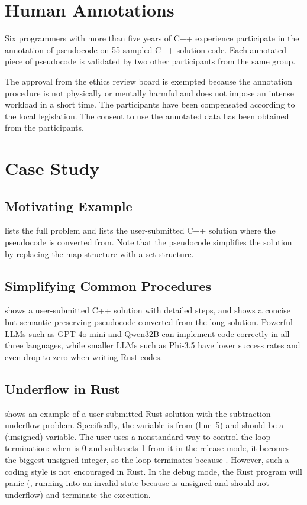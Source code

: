 \section{Human Annotations}
Six programmers with more than five years of C++ experience participate in the annotation of pseudocode on 55 sampled C++ solution code.
Each annotated piece of pseudocode is validated by two other participants from the same group.

The approval from the ethics review board is exempted because the annotation procedure is not physically or mentally harmful and does not impose an intense workload in a short time.
The participants have been compensated according to the local legislation.
The consent to use the annotated data has been obtained from the participants.

\section{Case Study}

\subsection{Motivating Example}\label{subsec:motv-ex}
 lists the full problem and  lists the user-submitted C++ solution where the pseudocode is converted from.
Note that the pseudocode simplifies the solution by replacing the map structure with a set structure.

\subsection{Simplifying Common Procedures}\label{subsec:simplication}
 shows a user-submitted C++ solution with detailed steps, and  shows a concise but semantic-preserving pseudocode converted from the long solution.
Powerful LLMs such as GPT-4o-mini and Qwen32B can implement code correctly in all three languages, while smaller LLMs such as Phi-3.5 have lower success rates and even drop to zero when writing Rust codes. 

\subsection{Underflow in Rust}\label{subsec:rust-underflow}
 shows an example of a user-submitted Rust solution with the subtraction underflow problem.
Specifically, the variable  is from  (line~5) and should be a  (unsigned) variable.
The user uses a nonstandard way to control the loop termination: when  is 0 and subtracts 1 from it in the release mode, it becomes the biggest unsigned integer, so the loop terminates because .
However, such a coding style is not encouraged in Rust.
In the debug mode, the Rust program will panic (\ie, running into an invalid state because  is unsigned and should not underflow) and terminate the execution.

